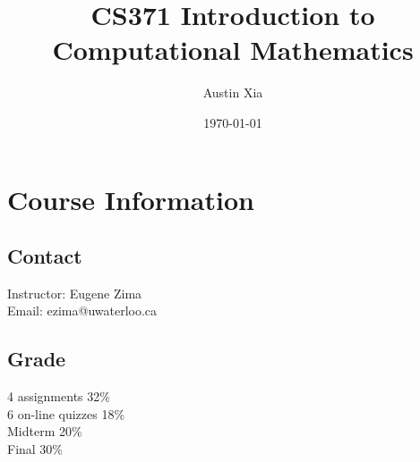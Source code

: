 \documentclass[10pt]{article}
\theoremstyle{break}
\begin{document}
\let\ref\Cref

\title{\bf{CS371 Introduction to Computational Mathematics}}
\date{\today}
\author{Austin Xia}

\maketitle
\newpage
\tableofcontents
\listoffigures
\listoftables
\newpage
\section{Course Information}
    \subsection{Contact}
        \begin{center}
            Instructor: Eugene Zima\\
            Email: ezima@uwaterloo.ca
        \end{center}
    \subsection{Grade}
        \begin{center}
            4 assignments 32\%\\
            6 on-line quizzes 18\%\\
            Midterm 20\%\\
            Final 30\%\\
        \end{center}
\end{document}
